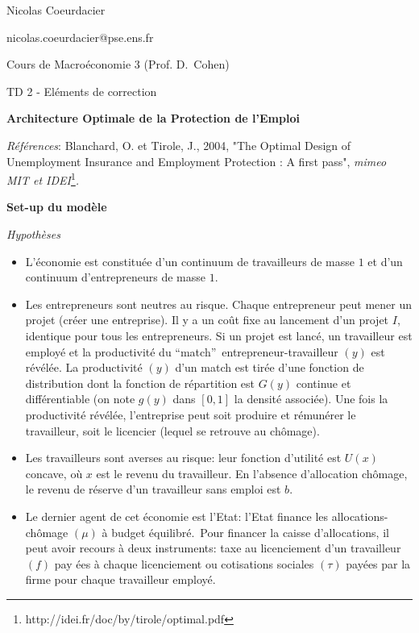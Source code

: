 \documentclass[a4paper]{article}
\begin{document}
{\small Nicolas Coeurdacier}

{\small nicolas.coeurdacier@pse.ens.fr}

{\small Cours de Macro\'{e}conomie 3 (Prof. D.\ Cohen)}

\begin{center}
\bigskip

TD 2 - El\'{e}ments de correction

\textbf{Architecture Optimale de la Protection de l'Emploi}
\end{center}

\bigskip

\textit{R\'{e}f\'{e}rences}: Blanchard, O. et Tirole, J., 2004, "The Optimal
Design of Unemployment Insurance and Employment Protection : A first pass", 
\textit{mimeo MIT et IDEI}\footnote{%
http://idei.fr/doc/by/tirole/optimal.pdf}\textit{.}

\bigskip

\textbf{Set-up du mod\`{e}le}

\medskip

\textit{Hypoth\`{e}ses}

\begin{itemize}
\item L'\'{e}conomie est constitu\'{e}e d'un continuum de travailleurs de
masse $1$ et d'un continuum d'entrepreneurs de masse $1$.

\item Les entrepreneurs sont neutres au risque. Chaque entrepreneur peut
mener un projet (cr\'{e}er une entreprise). Il y a un co\^{u}t fixe au
lancement d'un projet $I$, identique pour tous les entrepreneurs. Si un
projet est lanc\'{e}, un travailleur est employ\'{e} et la productivit\'{e}
du \textquotedblleft match\textquotedblright\ entrepreneur-travailleur $(y)$
est r\'{e}v\'{e}l\'{e}e. La productivit\'{e} $(y)$ d'un match est tir\'{e}e
d'une fonction de distribution dont la fonction de r\'{e}partition est $G(y)$
continue et diff\'{e}rentiable (on note $g(y)$ dans $[0,1]$ la densit\'{e}
associ\'{e}e). Une fois la productivit\'{e} r\'{e}v\'{e}l\'{e}e,
l'entreprise peut soit produire et r\'{e}mun\'{e}rer le travailleur, soit le
licencier (lequel se retrouve au ch\^{o}mage).

\item Les travailleurs sont averses au risque: leur fonction d'utilit\'{e}
est $U(x)$ concave, o\`{u} $x$ est le revenu du travailleur. En l'absence
d'allocation ch\^{o}mage, le revenu de r\'{e}serve d'un travailleur sans
emploi est $b$.

\item Le dernier agent de cet \'{e}conomie est l'Etat: l'Etat finance les
allocations-ch\^{o}mage $(\mu )$ \`{a} budget \'{e}quilibr\'{e}.\ Pour
financer la caisse d'allocations, il peut avoir recours \`{a} deux
instruments: taxe au licenciement d'un travailleur $\left( f\right) $ pay%
\'{e}es \`{a} chaque licenciement ou cotisations sociales $\left( \tau
\right) $ pay\'{e}es par la firme pour chaque travailleur employ\'{e}.
\end{itemize}
\end{document}
